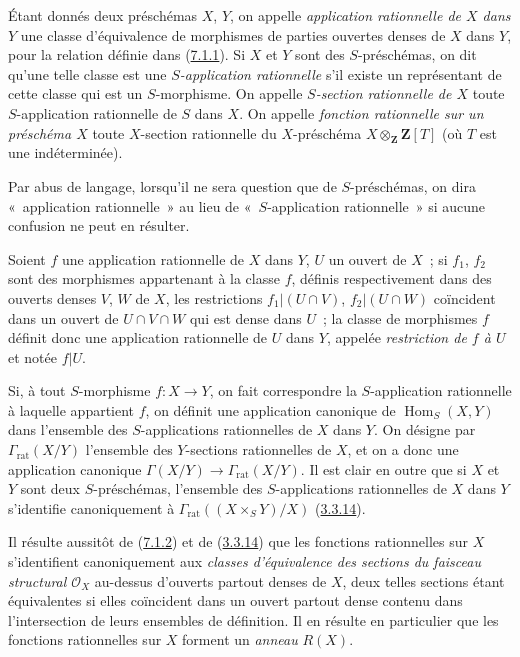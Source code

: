 \begin{definition}[7.1.2]
\label{I.7.1.2-fr}
Étant donnés deux préschémas $X$, $Y$, on appelle
\emph{application rationnelle de $X$ dans $Y$} une classe d'équivalence de
morphismes de parties ouvertes denses de $X$ dans $Y$, pour la relation
définie dans (\hyperref[I.7.1.1-fr]{7.1.1}). Si $X$ et $Y$ sont des
$S$-préschémas, on dit qu'une telle classe est une
\emph{$S$-application rationnelle} s'il existe un représentant de cette classe
qui est un $S$-morphisme. On appelle
\emph{$S$-section rationnelle de $X$} toute $S$-application rationnelle de $S$
dans $X$. On appelle
\emph{fonction rationnelle sur un préschéma $X$} toute $X$-section rationnelle
du $X$-préschéma $X\otimes_{\mathbf{Z}}\mathbf{Z}[T]$ (où $T$ est une
indéterminée).

Par abus de langage, lorsqu'il ne sera question que de $S$-préschémas, on dira
«~application rationnelle~» au lieu de «~$S$-application rationnelle~» si
aucune confusion ne peut en résulter.

Soient $f$ une application rationnelle de $X$ dans $Y$, $U$ un ouvert de
$X$~; si $f_1$, $f_2$ sont des morphismes appartenant à la classe $f$, définis
respectivement dans des ouverts denses $V$, $W$ de $X$, les restrictions
$f_1|(U\cap V)$, $f_2|(U\cap W)$ coïncident dans un ouvert de $U\cap V\cap W$ qui est dense
dans $U$~; la classe de morphismes $f$ définit donc une application rationnelle
de $U$ dans $Y$, appelée
\emph{restriction de $f$ à $U$} et notée $f|U$.

Si, à tout $S$-morphisme $f:X\to Y$, on fait correspondre la $S$-application
rationnelle
à laquelle appartient $f$, on définit une application canonique de
$\operatorname{Hom}_S(X,Y)$ dans l'ensemble des $S$-applications rationnelles
de $X$ dans $Y$. On désigne par $\Gamma_{\mathrm{rat}}(X/Y)$ l'ensemble des
$Y$-sections rationnelles de $X$, et on a donc une application canonique
$\Gamma(X/Y)\to\Gamma_{\mathrm{rat}}(X/Y)$. Il est clair en outre que si $X$ et
$Y$ sont deux $S$-préschémas, l'ensemble des $S$-applications rationnelles de
$X$ dans $Y$ s'identifie canoniquement à
$\Gamma_{\mathrm{rat}}((X\times_S Y)/X)$
(\hyperref[I.3.3.14-fr]{3.3.14}).
\end{definition}

\begin{env}[7.1.3]
\label{I.7.1.3-fr}
Il résulte aussitôt de (\hyperref[I.7.1.2-fr]{7.1.2}) et de
(\hyperref[I.3.3.14-fr]{3.3.14}) que les fonctions rationnelles sur $X$
s'identifient canoniquement aux
\emph{classes d'équivalence des sections du faisceau structural
$\mathscr{O}_X$} au-dessus d'ouverts partout denses de $X$, deux telles
sections étant équivalentes si elles coïncident dans un ouvert partout dense
contenu dans l'intersection de leurs ensembles de définition. Il en résulte en
particulier que les fonctions rationnelles sur $X$ forment un
\emph{anneau} $R(X)$.
\end{env}

